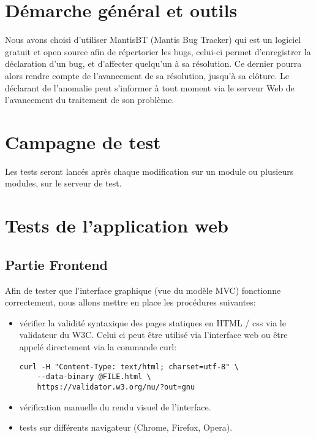 \section{Démarche général et outils}
\label{section:dem_gen}
Nous avons choisi d'utiliser MantisBT (Mantis Bug Tracker) qui est un logiciel gratuit
et open source afin de répertorier les bugs, celui-ci permet d'enregistrer la déclaration
 d'un bug, et d'affecter quelqu'un à sa résolution. Ce dernier pourra alors rendre compte de
l'avancement de sa résolution, jusqu'à sa clôture. Le déclarant de l'anomalie peut  
s'informer à tout moment via le serveur Web de l'avancement du traitement de 
son problème.  

\section{Campagne de test}
Les tests seront lancés après chaque modification sur un module ou plusieurs modules, sur
le serveur de test.

\section{Tests de l'application web}

\subsection{Partie Frontend}

Afin de tester que l'interface graphique (vue du modèle MVC) fonctionne correctement, nous allons mettre en place les procédures suivantes:
\begin{itemize}

    \item vérifier la validité syntaxique des pages statiques en HTML / css via 
          le validateur du W3C. Celui ci peut être utilisé via l'interface web ou  
          être appelé directement via la commande curl:
          \begin{verbatim}
curl -H "Content-Type: text/html; charset=utf-8" \
    --data-binary @FILE.html \
    https://validator.w3.org/nu/?out=gnu
          \end{verbatim}
              
    \item vérification manuelle du rendu visuel de l'interface.
    \item tests sur différents navigateur (Chrome, Firefox, Opera).
            
\end{itemize}
\newpage

